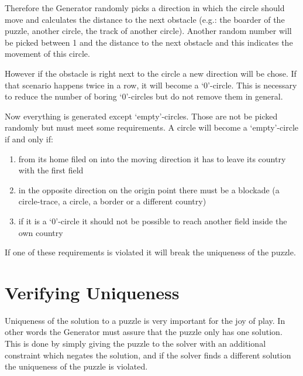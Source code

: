 Therefore the Generator randomly picks a direction in which the circle should move and calculates the distance to the next obstacle (e.g.: the boarder of the puzzle, another circle, the track of another circle). Another random number will be picked between 1 and the distance to the next obstacle and this indicates the movement of this circle. 

However if the obstacle is right next to the circle a new direction will be chose. If that scenario happens twice in a row, it will become a `0'-circle. This is necessary to reduce the number of boring `0'-circles but do not remove them in general.

Now everything is generated except `empty'-circles. Those are not be picked randomly but must meet some requirements. A circle will become a `empty'-circle if and only if:
\begin{enumerate}
  \item from its home filed on into the moving direction it has to leave its country with the first field
  \item in the opposite direction on the origin point there must be a blockade (a circle-trace, a circle, a border or a different country)
  \item if it is a `0'-circle it should not be possible to reach another field inside the own country
\end{enumerate}
If one of these requirements is violated it will break the uniqueness of the puzzle.

\section{Verifying Uniqueness}
Uniqueness of the solution to a puzzle is very important for the joy of play. In other words the Generator must assure that the puzzle only has one solution. This is done by simply giving the puzzle to the solver with an additional constraint which negates the solution, and if the solver finds a different solution the uniqueness of the puzzle is violated.

